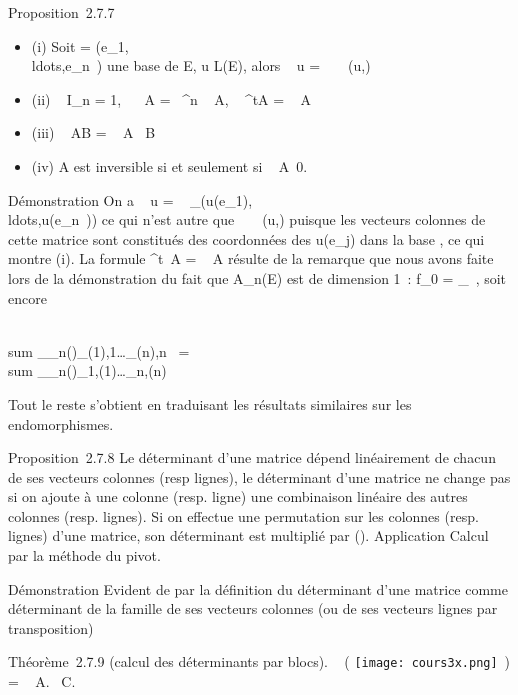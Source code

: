 \documentclass[]{article}
\begin{document}
Proposition~2.7.7

\begin{itemize}
\itemsep1pt\parskip0pt
\item
  (i) Soit  =
  (e_1,\\ldots,e_n~)
  une base de E, u \in L(E), alors
  ~ u
  = ~
  \mathrmMat~ (u,)
\item
  (ii) ~
  I_n = 1,
  ~ \lambda~A =
  \lambda~^n ~
  A, ~
  ^tA = ~
  A
\item
  (iii) ~ AB
  = ~
  A~ B
\item
  (iv) A est inversible si et seulement si
  ~
  A\neq~0.
\end{itemize}

Démonstration On a
~ u
= ~
_(u(e_1),\\ldots,u(e_n~))
ce qui n'est autre que
~
\mathrmMat~ (u,) puisque
les vecteurs colonnes de cette matrice sont constitués des coordonnées
des u(e_j) dans la base , ce qui montre (i). La formule
 ^t~A
= ~ A résulte de
la remarque que nous avons faite lors de la démonstration du fait que
A_n(E) est de dimension 1~: f_0
=  _~,
soit encore

\\sum
_\sigma\inS_n\epsilon(\sigma)\xi_\sigma(1),1\ldots\xi_\sigma(n),n~
= \\sum
_\sigma\inS_n\epsilon(\sigma)\xi_1,\sigma(1)\ldots\xi_n,\sigma(n)~

Tout le reste s'obtient en traduisant les résultats similaires sur les
endomorphismes.

Proposition~2.7.8 Le déterminant d'une matrice dépend linéairement de
chacun de ses vecteurs colonnes (resp lignes), le déterminant d'une
matrice ne change pas si on ajoute à une colonne (resp. ligne) une
combinaison linéaire des autres colonnes (resp. lignes). Si on effectue
une permutation \sigma sur les colonnes (resp. lignes) d'une matrice, son
déterminant est multiplié par \epsilon(\sigma). Application Calcul par la méthode du
pivot.

Démonstration Evident de par la définition du déterminant d'une matrice
comme déterminant de la famille de ses vecteurs colonnes (ou de ses
vecteurs lignes par transposition)

Théorème~2.7.9 (calcul des déterminants par blocs).
~
\left ( \texttt{[image: cours3x.png]}
\,\right ) = \
A.~ C.
\end{document}
